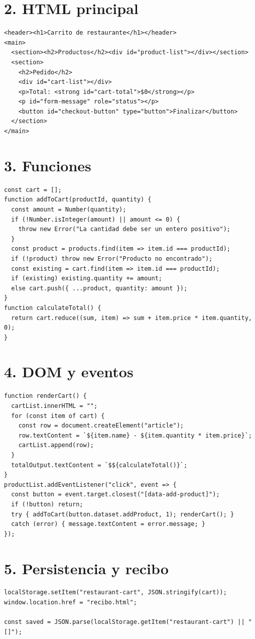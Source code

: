 \documentclass[10pt,a4paper]{article}
\begin{document}
\section*{2. HTML principal}
\begin{lstlisting}
<header><h1>Carrito de restaurante</h1></header>
<main>
  <section><h2>Productos</h2><div id="product-list"></div></section>
  <section>
    <h2>Pedido</h2>
    <div id="cart-list"></div>
    <p>Total: <strong id="cart-total">$0</strong></p>
    <p id="form-message" role="status"></p>
    <button id="checkout-button" type="button">Finalizar</button>
  </section>
</main>
\end{lstlisting}
\section*{3. Funciones}
\begin{lstlisting}
const cart = [];
function addToCart(productId, quantity) {
  const amount = Number(quantity);
  if (!Number.isInteger(amount) || amount <= 0) {
    throw new Error("La cantidad debe ser un entero positivo");
  }
  const product = products.find(item => item.id === productId);
  if (!product) throw new Error("Producto no encontrado");
  const existing = cart.find(item => item.id === productId);
  if (existing) existing.quantity += amount;
  else cart.push({ ...product, quantity: amount });
}
function calculateTotal() {
  return cart.reduce((sum, item) => sum + item.price * item.quantity, 0);
}
\end{lstlisting}

\newpage
\section*{4. DOM y eventos}
\begin{lstlisting}
function renderCart() {
  cartList.innerHTML = "";
  for (const item of cart) {
    const row = document.createElement("article");
    row.textContent = `${item.name} - ${item.quantity * item.price}`;
    cartList.append(row);
  }
  totalOutput.textContent = `$${calculateTotal()}`;
}
productList.addEventListener("click", event => {
  const button = event.target.closest("[data-add-product]");
  if (!button) return;
  try { addToCart(button.dataset.addProduct, 1); renderCart(); }
  catch (error) { message.textContent = error.message; }
});
\end{lstlisting}
\section*{5. Persistencia y recibo}
\begin{lstlisting}
localStorage.setItem("restaurant-cart", JSON.stringify(cart));
window.location.href = "recibo.html";

const saved = JSON.parse(localStorage.getItem("restaurant-cart") || "[]");
\end{lstlisting}
\end{document}
